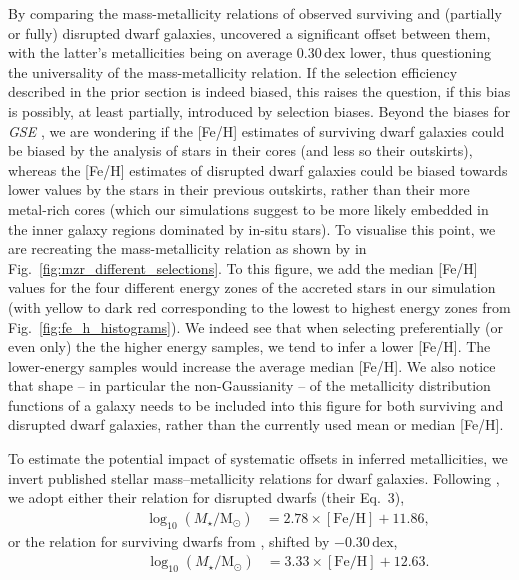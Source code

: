 \documentclass[fleqn,usenatbib]{mnras}
\begin{document}
By comparing the mass-metallicity relations of observed surviving and (partially or fully) disrupted dwarf galaxies, \citet{Naidu2022b} uncovered a significant offset between them, with the latter's metallicities being on average 0.30\,dex lower, thus questioning the universality of the mass-metallicity relation. If the selection efficiency described in the prior section is indeed biased, this raises the question, if this bias is possibly, at least partially, introduced by selection biases. Beyond the biases for \textit{GSE} \citep{Skuladottir2025}, we are wondering if the [Fe/H] estimates of surviving dwarf galaxies could be biased by the analysis of stars in their cores (and less so their outskirts), whereas the [Fe/H] estimates of disrupted dwarf galaxies could be biased towards lower values by the stars in their previous outskirts, rather than their more metal-rich cores (which our simulations suggest to be more likely embedded in the inner galaxy regions dominated by in-situ stars). To visualise this point, we are recreating the mass-metallicity relation as shown by \citet{Naidu2022b} in Fig.~\ref{fig:mzr_different_selections}. To this figure, we add the median [Fe/H] values for the four different energy zones of the accreted stars in our simulation (with yellow to dark red corresponding to the lowest to highest energy zones from Fig.~\ref{fig:fe_h_histograms}). We indeed see that when selecting preferentially (or even only) the the higher energy samples, we tend to infer a lower [Fe/H]. The lower-energy samples would increase the average median [Fe/H]. We also notice that shape -- in particular the non-Gaussianity -- of the metallicity distribution functions of a galaxy needs to be included into this figure for both surviving and disrupted dwarf galaxies, rather than the currently used mean or median [Fe/H].

To estimate the potential impact of systematic offsets in inferred metallicities, we invert published stellar mass–metallicity relations for dwarf galaxies. Following \citet{Naidu2022b}, we adopt either their relation for disrupted dwarfs (their Eq.~3),
\begin{align}
\qquad\qquad    \log_{10} (M_\star/\mathrm{M_\odot}) &= 2.78 \times \mathrm{[Fe/H]} + 11.86 , \label{eq:naidu}
\end{align}
or the relation for surviving dwarfs from \citet{Kirby2013}, shifted by $-0.30\,\mathrm{dex}$,
\begin{align}
\qquad\qquad    \log_{10} (M_\star/\mathrm{M_\odot}) &= 3.33 \times \mathrm{[Fe/H]} + 12.63 . \label{eq:kirby}
\end{align}
\end{document}
